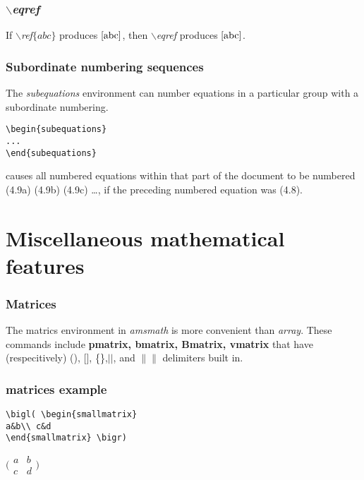 \documentclass[12pt]{beamer}
\begin{document}
\begin{frame}
\frametitle{$\backslash$\emph{eqref}}
  If $\backslash$\emph{ref$\{abc\}$} produces $\ref{abc}$, then $\backslash$\emph{eqref} produces $\eqref{abc}$.
\end{frame}

\begin{frame}[fragile]
  \frametitle{Subordinate numbering sequences}
  The \emph{subequations} environment can number equations in a particular group with a subordinate numbering.\\
  \begin{verbatim}
\begin{subequations}
...
\end{subequations}
  \end{verbatim}
  causes all numbered equations within that part of the document to be numbered (4.9a) (4.9b) (4.9c) \ldots , if the preceding numbered equation was (4.8).
\end{frame}

\section{Miscellaneous mathematical features}

\begin{frame}[fragile]
\frametitle{Matrices}
The matrics environment in \emph{amsmath} is more convenient than \emph{array}. These commands include \textbf{pmatrix, bmatrix, Bmatrix, vmatrix} that have (respecitively) (), [], \{\},$||$, and $\|\|$ delimiters built in.
\end{frame}
\begin{frame}[fragile]
\frametitle{matrices example}
    \begin{verbatim}
\bigl( \begin{smallmatrix}
a&b\\ c&d
\end{smallmatrix} \bigr)
    \end{verbatim}
    $\bigl( \begin{smallmatrix}
a&b\\ c&d
\end{smallmatrix} \bigr)$
\end{frame}
\end{document}
